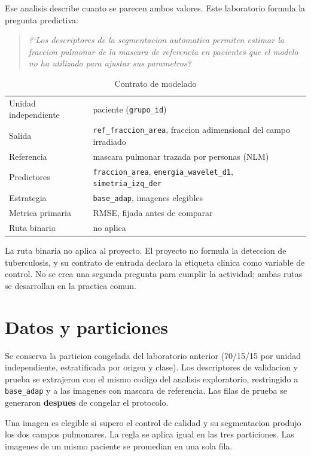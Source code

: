 \documentclass[11pt,a4paper]{article}
\begin{document}
Ese analisis describe cuanto se parecen ambos valores. Este laboratorio
formula la pregunta predictiva:

\begin{quote}
\emph{?`Los descriptores de la segmentacion automatica permiten estimar la
fraccion pulmonar de la mascara de referencia en pacientes que el modelo no ha
utilizado para ajustar sus parametros?}
\end{quote}

\begin{table}[H]
\centering
\small
\caption{Contrato de modelado}
\begin{tabular}{@{}ll@{}}
\toprule
Unidad independiente & paciente (\texttt{grupo\_id}) \\
Salida & \texttt{ref\_fraccion\_area}, fraccion adimensional del campo irradiado \\
Referencia & mascara pulmonar trazada por personas (NLM) \\
Predictores & \texttt{fraccion\_area}, \texttt{energia\_wavelet\_d1}, \texttt{simetria\_izq\_der} \\
Estrategia & \texttt{base\_adap}, imagenes elegibles \\
Metrica primaria & RMSE, fijada antes de comparar \\
Ruta binaria & no aplica \\
\bottomrule
\end{tabular}
\end{table}

La ruta binaria no aplica al proyecto. El proyecto no formula la deteccion de
tuberculosis, y su contrato de entrada declara la etiqueta clinica como
variable de control. No se crea una segunda pregunta para cumplir la
actividad; ambas rutas se desarrollan en la practica comun.

\section{Datos y particiones}

Se conserva la particion congelada del laboratorio anterior (70/15/15 por
unidad independiente, estratificada por origen y clase). Los descriptores de
validacion y prueba se extrajeron con el mismo codigo del analisis
exploratorio, restringido a \texttt{base\_adap} y a las imagenes con mascara de
referencia. Las filas de prueba se generaron \textbf{despues} de congelar el
protocolo.

Una imagen es elegible si supero el control de calidad y su segmentacion
produjo los dos campos pulmonares. La regla se aplica igual en las tres
particiones. Las imagenes de un mismo paciente se promedian en una sola fila.
\end{document}
